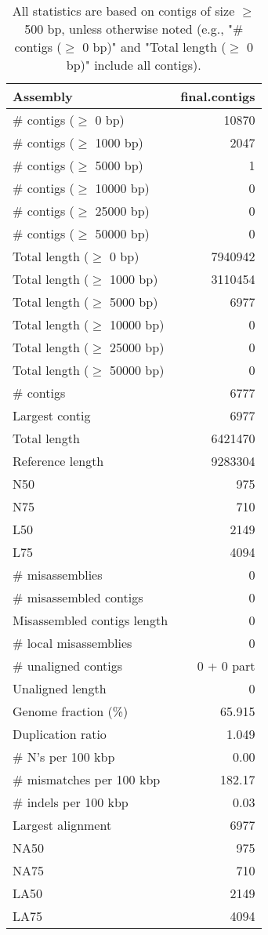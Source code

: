 \documentclass[12pt,a4paper]{article}
\begin{document}
\begin{table}[ht]
\begin{center}
\caption{All statistics are based on contigs of size $\geq$ 500 bp, unless otherwise noted (e.g., "\# contigs ($\geq$ 0 bp)" and "Total length ($\geq$ 0 bp)" include all contigs).}
\begin{tabular}{|l*{1}{|r}|}
\hline
Assembly & final.contigs \\ \hline
\# contigs ($\geq$ 0 bp) & 10870 \\ \hline
\# contigs ($\geq$ 1000 bp) & 2047 \\ \hline
\# contigs ($\geq$ 5000 bp) & 1 \\ \hline
\# contigs ($\geq$ 10000 bp) & 0 \\ \hline
\# contigs ($\geq$ 25000 bp) & 0 \\ \hline
\# contigs ($\geq$ 50000 bp) & 0 \\ \hline
Total length ($\geq$ 0 bp) & 7940942 \\ \hline
Total length ($\geq$ 1000 bp) & 3110454 \\ \hline
Total length ($\geq$ 5000 bp) & 6977 \\ \hline
Total length ($\geq$ 10000 bp) & 0 \\ \hline
Total length ($\geq$ 25000 bp) & 0 \\ \hline
Total length ($\geq$ 50000 bp) & 0 \\ \hline
\# contigs & 6777 \\ \hline
Largest contig & 6977 \\ \hline
Total length & 6421470 \\ \hline
Reference length & 9283304 \\ \hline
N50 & 975 \\ \hline
N75 & 710 \\ \hline
L50 & 2149 \\ \hline
L75 & 4094 \\ \hline
\# misassemblies & 0 \\ \hline
\# misassembled contigs & 0 \\ \hline
Misassembled contigs length & 0 \\ \hline
\# local misassemblies & 0 \\ \hline
\# unaligned contigs & 0 + 0 part \\ \hline
Unaligned length & 0 \\ \hline
Genome fraction (\%) & 65.915 \\ \hline
Duplication ratio & 1.049 \\ \hline
\# N's per 100 kbp & 0.00 \\ \hline
\# mismatches per 100 kbp & 182.17 \\ \hline
\# indels per 100 kbp & 0.03 \\ \hline
Largest alignment & 6977 \\ \hline
NA50 & 975 \\ \hline
NA75 & 710 \\ \hline
LA50 & 2149 \\ \hline
LA75 & 4094 \\ \hline
\end{tabular}
\end{center}
\end{table}
\end{document}

